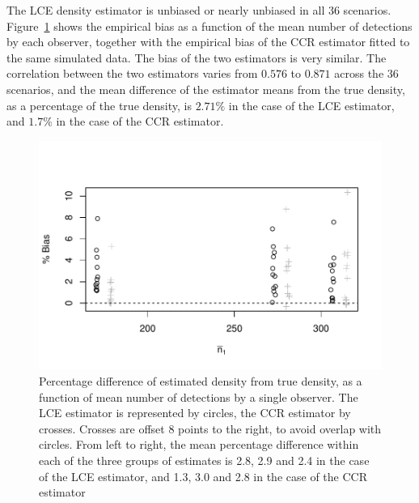\documentclass[useAMS, usenatbib, referee]{biom}\usepackage[]{graphicx}\usepackage[]{color}
\makeatletter
\def\maxwidth{ %
  \ifdim\Gin@nat@width>\linewidth
    \linewidth
  \else
    \Gin@nat@width
  \fi
}
\newenvironment{knitrout}{}{} %
\makeatother
\begin{document}
The LCE density estimator is unbiased or nearly unbiased in all 36 scenarios. Figure~\ref{fig:fig_mlepalm_bias_bcs} shows the empirical bias as a function of the mean number of detections by each observer, together with the empirical bias of the CCR estimator fitted to the same simulated data. The bias of the two estimators is very similar. The correlation between the two estimators varies from $0.576$ to $0.871$ across the 36 scenarios, and the mean difference of the estimator means from the true density, as a percentage of the true density, is $2.71\%$ in the case of the LCE estimator, and $1.7\%$ in the case of the CCR estimator.

\begin{knitrout}
\color{fgcolor}\begin{figure}

{\centering \includegraphics[width=\maxwidth]{figure/fig_mlepalm_bias_bcs-1} 

}

\caption[Percentage difference of estimated density from true density, as a function of mean number of detections by a single observer]{Percentage difference of estimated density from true density, as a function of mean number of detections by a single observer. The LCE estimator is represented by circles, the CCR estimator by crosses. Crosses are offset 8 points to the right, to avoid overlap with circles. From left to right, the mean percentage difference within each of the three groups of estimates is 2.8, 2.9 and 2.4 in the case of the LCE estimator, and 1.3, 3.0 and 2.8 in the case of the CCR estimator }\label{fig:fig_mlepalm_bias_bcs}
\end{figure}


\end{knitrout}
\end{document}
